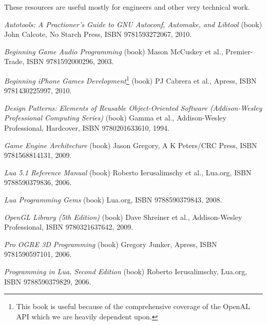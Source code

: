 
These resources are useful mostly for engineers and other very technical work.

\startitemize[3]
\setupwhitespace[big]
\item
{\it Autotools: A Practioner's Guide to GNU Autoconf, Automake, and Libtool} (book)\crlf
John Calcote, No Starch Press, ISBN 9781593272067, 2010.

\item
{\it Beginning Game Audio Programming} (book)\crlf
Mason McCuskey et al., Premier-Trade, ISBN 9781592000296, 2003.

\item
{\it Beginning iPhone Games Development}\footnote{This book is useful because of the comprehensive coverage of the OpenAL API which we are heavily dependent upon.} (book)\crlf
PJ Cabrera et al., Apress, ISBN 9781430225997, 2010.

\item
{\it Design Patterns: Elements of Reusable Object-Oriented Software (Addison-Wesley Professional Computing Series)} (book)\crlf
Gamma et al., Addison-Wesley Professional, Hardcover, ISBN 9780201633610, 1994.

\item
{\it Game Engine Architecture} (book)\crlf
Jason Gregory, A K Peters/CRC Press, ISBN 9781568814131, 2009.

\item
{\it Lua 5.1 Reference Manual} (book)\crlf
Roberto Ierusalimschy et al., Lua.org, ISBN 9788590379836, 2006.

\item
{\it Lua Programming Gems} (book)\crlf
Lua.org, ISBN 9788590379843, 2008.

\item
{\it OpenGL Library (5th Edition)} (book)\crlf
Dave Shreiner et al., Addison-Wesley Professional, ISBN 9780321637642, 2009.

\item
{\it Pro OGRE 3D Programming} (book)\crlf
Gregory Junker, Apress, ISBN 9781590597101, 2006.

\item
{\it Programming in Lua, Second Edition} (book)\crlf
Roberto Ierusalimschy, Lua.org, ISBN 9788590379829, 2006.

